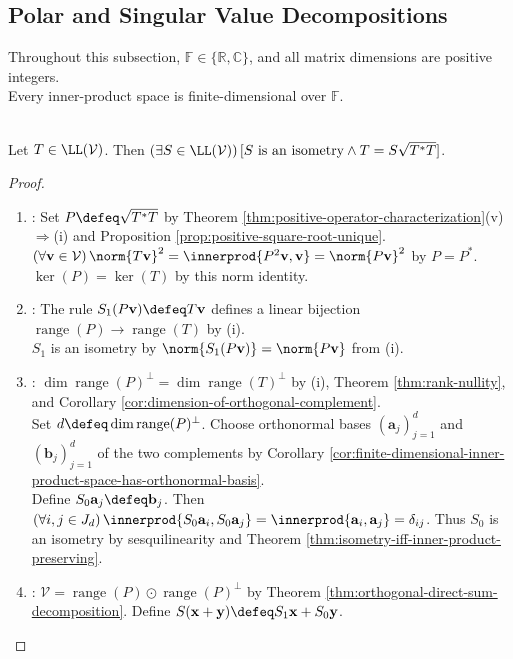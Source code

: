 \subsection{Polar and Singular Value Decompositions}

Throughout this subsection, $\mathbb{F}\in\{\mathbb{R},\mathbb{C}\}$, and all matrix dimensions are positive integers.\\
Every inner-product space is finite-dimensional over $\mathbb{F}$.

\begin{theorem} \label{thm:polar-decomposition} \\
Let $T\in\LL(\mathcal{V})$. Then $(\exists S\in\LL(\mathcal{V}))\,[S\text{ is an isometry}\land T=S\sqrt{T^*T}]$.
\begin{proof}
\begin{enumerate}[label=(\roman*)]
\setlength{\itemsep}{0pt}
\item {}: Set $P\defeq\sqrt{T^*T}$ by Theorem \ref{thm:positive-operator-characterization}(v)$\Rightarrow$(i) and Proposition \ref{prop:positive-square-root-unique}.\\
$(\forall\mathbf{v}\in\mathcal{V})\,\norm{T\mathbf{v}}^2=\innerprod{P^2\mathbf{v},\mathbf{v}}=\norm{P\mathbf{v}}^2$ by $P=P^*$. $\ker(P)=\ker(T)$ by this norm identity.
\item {}: The rule $S_1(P\mathbf{v})\defeq T\mathbf{v}$ defines a linear bijection $\operatorname{range}(P)\to\operatorname{range}(T)$ by (i).\\
$S_1$ is an isometry by $\norm{S_1(P\mathbf{v})}=\norm{P\mathbf{v}}$ from (i).
\item {}: $\dim\operatorname{range}(P)^\perp=\dim\operatorname{range}(T)^\perp$ by (i), Theorem \ref{thm:rank-nullity}, and Corollary \ref{cor:dimension-of-orthogonal-complement}.\\
Set $d\defeq\dim\operatorname{range}(P)^\perp$. Choose orthonormal bases $(\mathbf{a}_j)_{j=1}^{d}$ and $(\mathbf{b}_j)_{j=1}^{d}$ of the two complements by Corollary \ref{cor:finite-dimensional-inner-product-space-has-orthonormal-basis}.\\
Define $S_0\mathbf{a}_j\defeq\mathbf{b}_j$. Then $(\forall i,j\in J_d)\,\innerprod{S_0\mathbf{a}_i,S_0\mathbf{a}_j}=\innerprod{\mathbf{a}_i,\mathbf{a}_j}=\delta_{ij}$. Thus $S_0$ is an isometry by sesquilinearity and Theorem \ref{thm:isometry-iff-inner-product-preserving}.
\item {}: $\mathcal{V}=\operatorname{range}(P)\odot\operatorname{range}(P)^\perp$ by Theorem \ref{thm:orthogonal-direct-sum-decomposition}. Define $S(\mathbf{x}+\mathbf{y})\defeq S_1\mathbf{x}+S_0\mathbf{y}$.\\

\end{enumerate}
\end{proof}
\end{theorem}
